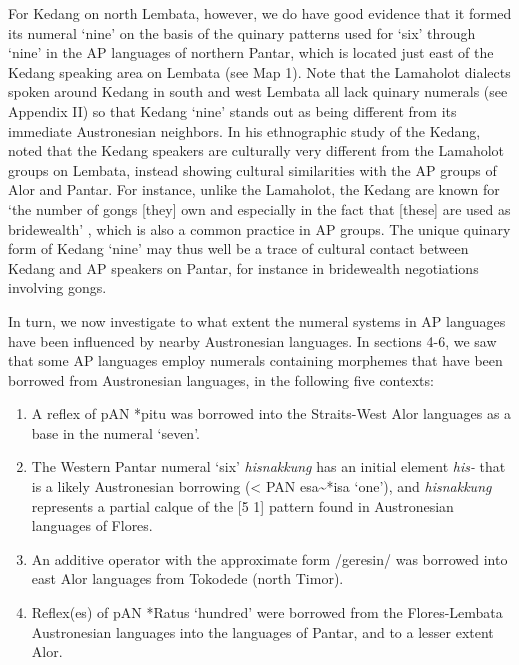 {For Kedang on north Lembata, however, we do have good evidence that it formed its numeral `nine' on the basis of the quinary patterns used for `six' through `nine' in the AP languages of northern Pantar, which is located just east of the Kedang speaking area on Lembata (see Map 1). Note that the Lamaholot dialects spoken around Kedang in south and west Lembata all lack quinary numerals (see Appendix II) so that Kedang `nine' stands out as being different from its immediate Austronesian neighbors. In his ethnographic study of the Kedang, \citet{Barnes1974} noted that the Kedang speakers are culturally very different from the Lamaholot groups on Lembata, instead showing cultural similarities with the AP groups of Alor and Pantar. For instance, unlike the Lamaholot, the Kedang are known for `the number of gongs [they] own and especially in the fact that [these] are used as bridewealth' \citep[15]{Barnes1974}, which is also a common practice in AP groups. The unique quinary form of Kedang `nine' may thus well be a trace of cultural contact between Kedang and AP speakers on Pantar, for instance in bridewealth negotiations involving gongs.{}

In turn, we now investigate to what extent the numeral systems in AP languages have been influenced by nearby Austronesian languages. In sections 4-6, we saw that some AP languages employ numerals containing morphemes that have been borrowed from Austronesian languages, in the following five contexts:


\begin{enumerate}
\item A reflex of pAN *pitu was borrowed into the Straits-West Alor languages as a base in the numeral `seven'.

\item The Western Pantar numeral `six' \textit{hisnakkung} has an initial element \textit{his-} that is a likely Austronesian borrowing ({\textless} PAN esa\~{}*isa `one'), and \textit{hisnakkung} represents a partial calque of the [5 1] pattern found in Austronesian languages of Flores.

\item An additive operator with the approximate form /geresin/ was borrowed into east Alor languages from Tokodede (north Timor).

\item Reflex(es) of pAN *Ratus `hundred' were borrowed from the Flores-Lembata Austronesian languages into the languages of Pantar, and to a lesser extent Alor.


\end{enumerate}}
